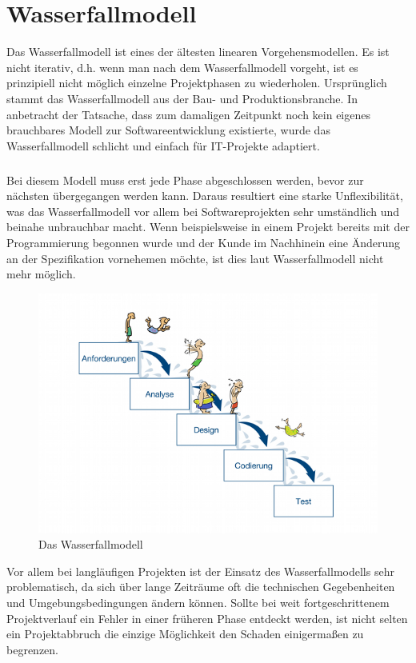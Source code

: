 \documentclass[a4paper, twopage]{scrreprt}
\begin{document}
\chapter{Wasserfallmodell}
\label{ch:wasserfallmodell}
Das Wasserfallmodell ist eines der ältesten linearen Vorgehensmodellen. Es ist nicht iterativ, d.h. wenn man nach dem Wasserfallmodell vorgeht, ist es prinzipiell nicht möglich einzelne Projektphasen zu wiederholen. Ursprünglich stammt das Wasserfallmodell aus der Bau- und Produktionsbranche. In anbetracht der Tatsache, dass zum damaligen Zeitpunkt noch kein eigenes brauchbares Modell zur Softwareentwicklung existierte, wurde das Wasserfallmodell schlicht und einfach für IT-Projekte adaptiert.
\paragraph*{}
Bei diesem Modell muss erst jede Phase abgeschlossen werden, bevor zur nächsten übergegangen werden kann. Daraus resultiert eine starke Unflexibilität, was das Wasserfallmodell vor allem bei Softwareprojekten sehr umständlich und beinahe unbrauchbar macht. Wenn beispielsweise in einem Projekt bereits mit der Programmierung begonnen wurde und der Kunde im Nachhinein eine Änderung an der Spezifikation vornehemen möchte, ist dies laut Wasserfallmodell nicht mehr möglich.
\begin{figure}[h]
\centering
	\includegraphics[scale=0.6]{Images/wasserfallmodell}
	\caption[Das Wasserfallmodell]{Das Wasserfallmodell\cite{scrumkompakt:wasserfallmodell}}
	\label{fig:wasserfallmodell}
\end{figure}
Vor allem bei langläufigen Projekten ist der Einsatz des Wasserfallmodells sehr problematisch, da sich über lange Zeiträume oft die technischen Gegebenheiten und Umgebungsbedingungen ändern können. Sollte bei weit fortgeschrittenem Projektverlauf ein Fehler in einer früheren Phase entdeckt werden, ist nicht selten ein Projektabbruch die einzige Möglichkeit den Schaden einigermaßen zu begrenzen.
\end{document}
